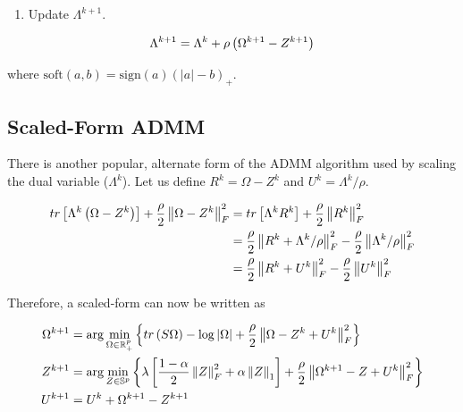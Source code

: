 \documentclass[11pt,]{report}
\providecommand{\tightlist}{%
  \setlength{\itemsep}{0pt}\setlength{\parskip}{0pt}}
\begin{document}
\begin{enumerate}
\def\labelenumi{\arabic{enumi}.}
\setcounter{enumi}{2}
\tightlist
\item
  Update \(\Lambda^{k + 1}\).
\end{enumerate}

\begin{equation}
\Lambda^{k + 1} = \Lambda^{k} + \rho\left( \Omega^{k + 1} - Z^{k + 1} \right)
\label{eq:lamalgo}\notag
\end{equation}

where \(\mbox{soft}(a, b) = \mbox{sign}(a)(\left| a \right| - b)_{+}\).

\hypertarget{scaled-form-admm}{%
\subsection{Scaled-Form ADMM}\label{scaled-form-admm}}

There is another popular, alternate form of the ADMM algorithm used by scaling the dual variable (\(\Lambda^{k}\)). Let us define \(R^{k} = \Omega - Z^{k}\) and \(U^{k} = \Lambda^{k}/\rho\).

\begin{equation}
\begin{split}
  tr\left[ \Lambda^{k}\left( \Omega - Z^{k} \right) \right] + \frac{\rho}{2}\left\| \Omega - Z^{k} \right\|_{F}^{2} &= tr\left[ \Lambda^{k}R^{k} \right] + \frac{\rho}{2}\left\| R^{k} \right\|_{F}^{2} \\
  &= \frac{\rho}{2}\left\| R^{k} + \Lambda^{k}/\rho \right\|_{F}^{2} - \frac{\rho}{2}\left\| \Lambda^{k}/\rho \right\|_{F}^{2} \\
  &= \frac{\rho}{2}\left\| R^{k} + U^{k} \right\|_{F}^{2} - \frac{\rho}{2}\left\| U^{k} \right\|_{F}^{2}
\label{eq:scaled}\notag
\end{split}
\end{equation}

Therefore, a scaled-form can now be written as

\begin{align}
  \Omega^{k + 1} &= \arg\min_{\Omega \in \mathbb{R}_{+}^{p}}\left\{ tr\left(S\Omega\right) - \log\left|\Omega\right| + \frac{\rho}{2}\left\| \Omega - Z^{k} + U^{k} \right\|_{F}^{2} \right\} \label{eq:omegascaled}\notag \\
  Z^{k + 1} &= \arg\min_{Z \in \mathbb{S}^{p}}\left\{ \lambda\left[ \frac{1 - \alpha}{2}\left\| Z \right\|_{F}^{2} + \alpha\left\| Z \right\|_{1} \right] + \frac{\rho}{2}\left\| \Omega^{k + 1} - Z + U^{k} \right\|_{F}^{2} \right\} \label{eq:ZZscaled}\notag \\
  U^{k + 1} &= U^{k} + \Omega^{k + 1} - Z^{k + 1} \label{eq:Uscaled}\notag
\end{align}
\end{document}
